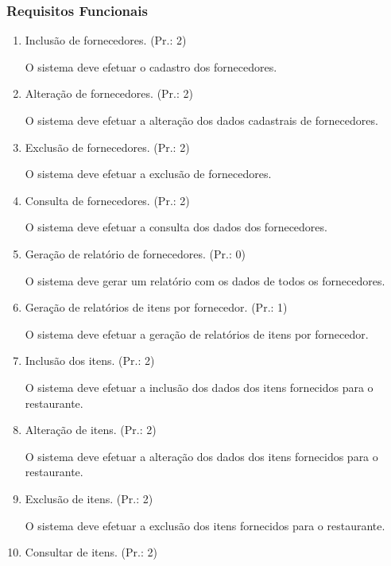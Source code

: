 \subsubsection{Requisitos Funcionais}
\begin{enumerate}[
	label=RF\arabic{*}, 
	ref=(RF\arabic{*}),
	leftmargin=1.5em,
	itemindent=4.5em]
\item Inclusão de fornecedores. (Pr.: 2)\par
O sistema deve efetuar o cadastro dos fornecedores.\par
\item Alteração de fornecedores. (Pr.: 2)\par
O sistema deve efetuar a alteração dos dados cadastrais de fornecedores.\par
\item Exclusão de fornecedores. (Pr.: 2)\par
O sistema deve efetuar a exclusão de fornecedores.\par
\item Consulta de fornecedores. (Pr.: 2)\par
O sistema deve efetuar a consulta dos dados dos fornecedores.\par
\item Geração de relatório de fornecedores. (Pr.: 0)\par
O sistema deve gerar um relatório com os dados de todos os fornecedores.\par
\item Geração de relatórios de itens por fornecedor. (Pr.: 1)\par
O sistema deve efetuar a geração de relatórios de itens por fornecedor.\par
\item Inclusão dos itens. (Pr.: 2)\par
O sistema deve efetuar a inclusão dos dados dos itens fornecidos para o restaurante.\par
\item Alteração de itens. (Pr.: 2)\par
O sistema deve efetuar a alteração dos dados dos itens fornecidos para o restaurante.\par
\item Exclusão de itens. (Pr.: 2)\par
O sistema deve efetuar a exclusão dos itens fornecidos para o restaurante.\par
\item Consultar de itens. (Pr.: 2)\par

\end{enumerate}
